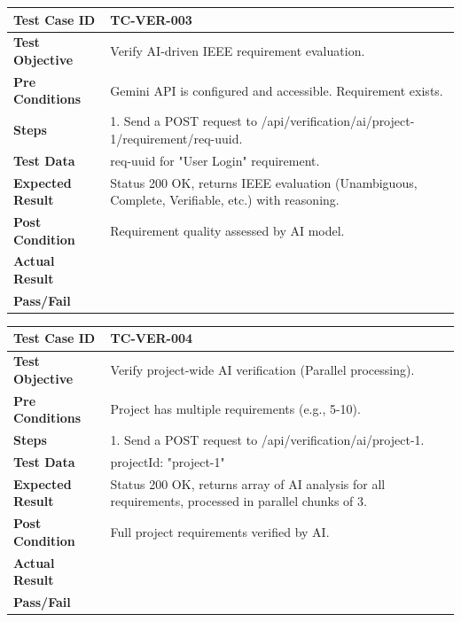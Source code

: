 \begin{longtable}{|p{}|p{}|}
\hline
\textbf{Test Case ID} & TC-VER-003 \\ \hline
\textbf{Test Objective} & Verify AI-driven IEEE requirement evaluation. \\ \hline
\textbf{Pre Conditions} & Gemini API is configured and accessible. Requirement exists. \\ \hline
\textbf{Steps} & 
1. Send a POST request to /api/verification/ai/project-1/requirement/req-uuid. \\ \hline
\textbf{Test Data} & req-uuid for "User Login" requirement. \\ \hline
\textbf{Expected Result} & Status 200 OK, returns IEEE evaluation (Unambiguous, Complete, Verifiable, etc.) with reasoning. \\ \hline
\textbf{Post Condition} & Requirement quality assessed by AI model. \\ \hline
\textbf{Actual Result} &  \\ \hline
\textbf{Pass/Fail} &  \\ \hline
\end{longtable}

\begin{longtable}{|p{}|p{}|}
\hline
\textbf{Test Case ID} & TC-VER-004 \\ \hline
\textbf{Test Objective} & Verify project-wide AI verification (Parallel processing). \\ \hline
\textbf{Pre Conditions} & Project has multiple requirements (e.g., 5-10). \\ \hline
\textbf{Steps} & 
1. Send a POST request to /api/verification/ai/project-1. \\ \hline
\textbf{Test Data} & projectId: "project-1" \\ \hline
\textbf{Expected Result} & Status 200 OK, returns array of AI analysis for all requirements, processed in parallel chunks of 3. \\ \hline
\textbf{Post Condition} & Full project requirements verified by AI. \\ \hline
\textbf{Actual Result} &  \\ \hline
\textbf{Pass/Fail} &  \\ \hline
\end{longtable}

